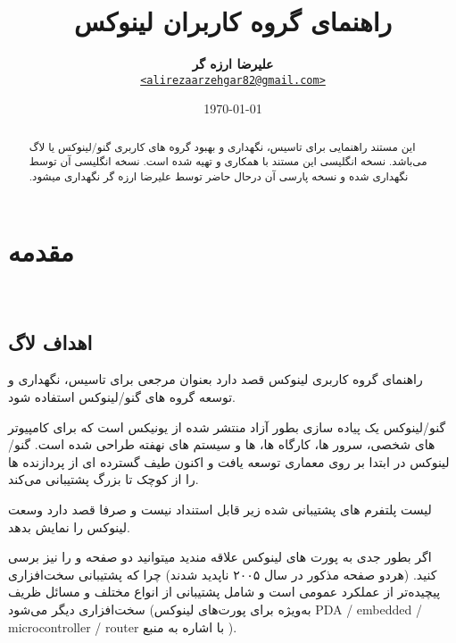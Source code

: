 \documentclass{HOWTO}
\title{راهنمای گروه کاربران لینوکس}
\author{{\textbf{علیرضا ارزه گر}} \\
  {\href{mailto:alirezaarzehgar82@gmail.com}
  {\texttt{<alirezaarzehgar82@gmail.com>}}}}
\date{\today}
\begin{document}
\maketitle
\begin{abstract}
‫این مستند راهنمایی برای تاسیس، نگهداری و بهبود گروه های کاربری گنو/لینوکس 
یا لاگ 
می‌باشد. نسخه انگلیسی این مستند با همکاری
و 
تهیه شده است. نسخه انگلیسی آن توسط 
نگهداری شده و نسخه پارسی آن درحال حاضر توسط علیرضا ارزه گر نگهداری میشود. 


\end{abstract}
\tableofcontents

\section{مقدمه}
‍‍‍‍‍	
\subsection{اهداف لاگ}

راهنمای گروه کاربری لینوکس قصد دارد بعنوان مرجعی برای تاسیس، نگهداری و توسعه گروه های گنو/لینوکس استفاده شود.

گنو/لینوکس یک پیاده سازی بطور آزاد منتشر شده از یونیکس است که برای کامپیوتر های شخصی، سرور ها، کارگاه ها،  ها و سیستم های نهفته طراحی شده است. گنو/لینوکس در ابتدا بر روی معماری  توسعه یافت و اکنون طیف گسترده ای از پردازنده ها را از کوچک تا بزرگ پشتیبانی می‌کند.

\begin{note}
لیست پلتفرم های پشتیبانی شده زیر قابل استنداد نیست و صرفا قصد دارد وسعت لینوکس را نمایش بدهد.
\end{note}


اگر بطور جدی به پورت های لینوکس علاقه مندید میتوانید دو صفحه
و
را نیز برسی کنید.  (هردو صفحه مذکور در سال ۲۰۰۵ ناپدید شدند)
چرا که پشتیبانی سخت‌افزاری پیچیده‌تر از عملکرد عمومی  است و شامل پشتیبانی از انواع مختلف  و مسائل ظریف سخت‌افزاری دیگر می‌شود (به‌ویژه برای پورت‌های لینوکس PDA / embedded / microcontroller / router با اشاره به منبع
).
\end{document}
